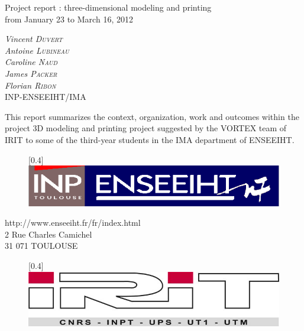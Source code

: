 \documentclass{report}
\begin{document}
\bigskip
\bigskip
\bigskip
\bigskip
\bigskip
\bigskip
\bigskip
\bigskip

\begin{center}
\Huge{Project report : three-dimensional modeling and printing\\}
\bigskip
\bigskip
\Large{from January 23 to March 16, 2012}
\end{center}

\bigskip
\bigskip

\begin{center}
\large{
\textit{Vincent \textsc{Duvert} \\
Antoine \textsc{Lubineau} \\
Caroline \textsc{Naud} \\
James \textsc{Packer} \\
Florian \textsc{Ribon}} \\
\bigskip
INP-ENSEEIHT/IMA 
}
\end{center}

\bigskip
\bigskip

	This report summarizes the context, organization, work and outcomes within the project 3D modeling and printing project suggested by the VORTEX team of IRIT to some of the third-year students in the IMA department of ENSEEIHT.

\bigskip
\bigskip

\begin{figure}[!h]
\begin{center}
\scalebox{0.4}[0.4]{\includegraphics{./Images/enseeiht}}
\end{center}
\end{figure}

\bigskip

\begin{center}
http://www.enseeiht.fr/fr/index.html \\
2 Rue Charles Camichel \\
31 071 TOULOUSE
\end{center}

\bigskip

\begin{figure}[!h]
\begin{center}
\scalebox{0.4}[0.4]{\includegraphics{./Images/irit}}
\end{center}
\end{figure}
\end{document}
